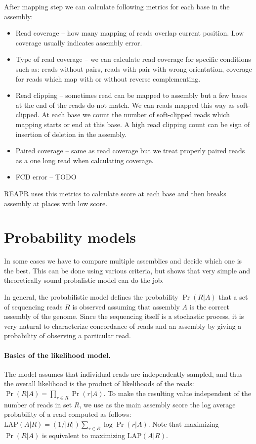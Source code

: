 After mapping step we can calculate following metrics for each base in the assembly:
\begin{itemize}
\item Read coverage -- how many mapping of reads overlap current position. Low coverage usually indicates assembly error.
\item Type of read coverage -- we can calculate read coverage for specific conditions such as: reads without pairs, reads with pair with wrong orientation,
coverage for reads which map with or without reverse complementing.
\item Read clipping -- sometimes read can be mapped to assembly but a few bases at the end of the reads do not match. We can reads mapped this way as soft-clipped.
At each base we count the number of soft-clipped reads which mapping starts or end at this base. A high read clipping count can be sign of insertion of deletion
in the assembly.
\item Paired coverage -- same as read coverage but we treat properly paired reads as a one long read when calculating coverage.
\item FCD error -- TODO
\end{itemize}

REAPR uses this metrics to calculate score at each base and then breaks assembly at places with low score.

\section{Probability models}
\label{sec:prob}
In some cases we have to compare multiple assemblies and decide which one is
the best. This can be done using various criteria, but \cite{Ghodsi2013} shows
that very simple and theoretically sound probalistic model can do the job.

In general, the probabilistic model defines the probability $\Pr(R|A)$ that a set of
sequencing reads $R$ is observed assuming that assembly $A$ is the
correct assembly of the genome. Since the sequencing itself is a
stochastic process, it is very natural to characterize concordance of
reads and an assembly by giving a probability of observing a particular
read.

\def\LAP{\mathrm{LAP}}

\paragraph{Basics of the likelihood model.}
The model assumes
that individual reads are independently sampled, and thus the overall
likelihood is the product of likelihoods of the reads:
$\Pr(R|A) = \prod_{r\in R} \Pr(r|A).$
To make
the resulting value independent of the number of reads in set 
$R$, we use as the main
assembly score the log average probability of a read computed as
follows: $\LAP(A|R) = (1/|R|)\sum_{r\in R} \log \Pr(r|A).$ Note that
maximizing $\Pr(R|A)$ is equivalent to maximizing $\LAP(A|R)$.

